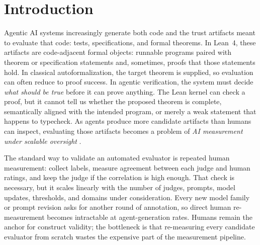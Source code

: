 \documentclass{article}
\begin{document}
\section{Introduction}

Agentic AI systems increasingly generate both code and the trust artifacts meant to evaluate that code: tests, specifications, and formal theorems.
In Lean~4, these artifacts are code-adjacent formal objects: runnable programs paired with theorem or specification statements and, sometimes, proofs that those statements hold.
In classical autoformalization, the target theorem is supplied, so evaluation can often reduce to proof success.
In agentic verification, the system must decide \emph{what should be true} before it can prove anything.
The Lean kernel can check a proof, but it cannot tell us whether the proposed theorem is complete, semantically aligned with the intended program, or merely a weak statement that happens to typecheck.
As agents produce more candidate artifacts than humans can inspect, evaluating those artifacts becomes a problem of \emph{AI measurement under scalable oversight} \citep{bowman2022scalable,zhou2025graders,khattab2024dspy,cheng2024trace,salaudeen2025measurement}.

The standard way to validate an automated evaluator is repeated human measurement: collect labels, measure agreement between each judge and human ratings, and keep the judge if the correlation is high enough.
That check is necessary, but it scales linearly with the number of judges, prompts, model updates, thresholds, and domains under consideration.
Every new model family or prompt revision asks for another round of annotation, so direct human re-measurement becomes intractable at agent-generation rates.
Humans remain the anchor for construct validity; the bottleneck is that re-measuring every candidate evaluator from scratch wastes the expensive part of the measurement pipeline.

\end{document}

